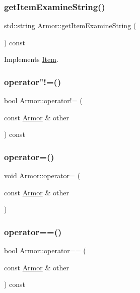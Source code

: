 \subsubsection{\texorpdfstring{get\+Item\+Examine\+String()}{getItemExamineString()}}
{\footnotesize\ttfamily std\+::string Armor\+::get\+Item\+Examine\+String (\begin{DoxyParamCaption}{ }\end{DoxyParamCaption}) const\hspace{0.3cm}{\ttfamily [virtual]}}



Implements \mbox{\hyperlink{class_item_a00e06647e1adeb62f2d95044476126ac}{Item}}.

\mbox{\label{class_armor_a912e1ad6bfe7509c66c2c4966cf5188c}} 
\subsubsection{\texorpdfstring{operator"!=()}{operator!=()}}
{\footnotesize\ttfamily bool Armor\+::operator!= (\begin{DoxyParamCaption}\item[{const \mbox{\hyperlink{class_armor}{Armor}} \&}]{other }\end{DoxyParamCaption}) const}

\mbox{\label{class_armor_ad706d994c7d3a3ea4d7c1728faccc0aa}} 
\subsubsection{\texorpdfstring{operator=()}{operator=()}}
{\footnotesize\ttfamily void Armor\+::operator= (\begin{DoxyParamCaption}\item[{const \mbox{\hyperlink{class_armor}{Armor}} \&}]{other }\end{DoxyParamCaption})}

\mbox{\label{class_armor_a400f558650400d25fc5fc3031a455c46}} 
\subsubsection{\texorpdfstring{operator==()}{operator==()}}
{\footnotesize\ttfamily bool Armor\+::operator== (\begin{DoxyParamCaption}\item[{const \mbox{\hyperlink{class_armor}{Armor}} \&}]{other }\end{DoxyParamCaption}) const}

